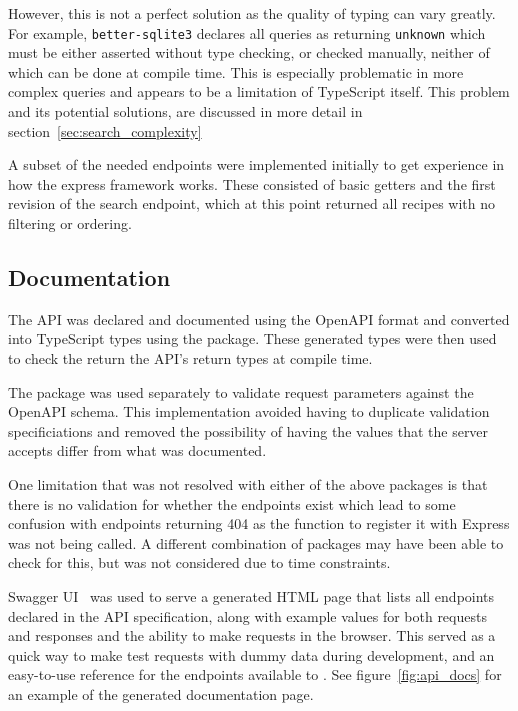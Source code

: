 However, this is not a perfect solution as the quality of typing can vary greatly. For example, \texttt{better-sqlite3}
declares all queries as returning \texttt{unknown} which must be either asserted without type checking, or checked manually, neither of which
can be done at compile time. This is especially problematic in more complex queries and appears to be a limitation of TypeScript itself. This
problem and its potential solutions, are discussed in more detail in section~\ref{sec:search_complexity}

A subset of the needed endpoints were implemented initially to get experience in how the express framework works.
These consisted of basic getters and the first revision of the search endpoint, which at this point returned all
recipes with no filtering or ordering.

\subsection{Documentation}
The API was declared and documented using the OpenAPI format and converted
into TypeScript types using the  package. These
generated types were then used to check the return the API's return types at compile time.

The  package was used separately to validate
request parameters against the OpenAPI schema. This implementation avoided having
to duplicate validation specificiations and removed the possibility of having the values that
the server accepts differ from what was documented.

One limitation that was not resolved with either of the above packages is that there is no validation
for whether the endpoints exist which lead to some confusion with endpoints returning 404 as the function to
register it with Express was not being called. A different combination of packages may have been able to check for this,
but was not considered due to time constraints.

Swagger UI~\cite{smartbear_swagger_2024} was used to serve a generated HTML page that lists all endpoints declared in
the API specification, along with example values for both requests and responses and the ability to make requests in
the browser. This served as a quick way to make test requests with dummy data during development, and an easy-to-use
reference for the endpoints available to . See figure~\ref{fig:api_docs} for an example of the
generated documentation page.

